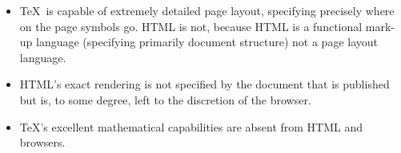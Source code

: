 \documentclass[landscape, headrule, footrule]{foils}
\begin{document}
%

\begin{itemize}
  \item \TeX\, is capable of extremely detailed page layout, specifying precisely where on the page symbols go.
HTML is not, because HTML is a functional mark-up language (specifying primarily document structure) not a page layout language.

  \item HTML's exact rendering is not specified by the document that is published but is, to some degree, left to the discretion of the browser.

  \item \TeX's excellent mathematical capabilities are absent from HTML and browsers. 

\end{itemize}
\end{document}
